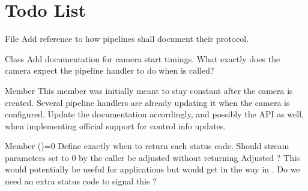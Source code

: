 \chapter{Todo List}
\hypertarget{todo}{}\label{todo}

\begin{DoxyRefList}
\item[File \doxylink{ipa__interface_8h}{ipa\+\_\+interface.h} ]\label{todo__todo000032}%
%
Add reference to how pipelines shall document their protocol. 
\item[Class \doxylink{classlibcamera_1_1Camera}{libcamera\+::Camera} ]\label{todo__todo000019}%
%
Add documentation for camera start timings. What exactly does the camera expect the pipeline handler to do when  is called? 
\item[Member \doxylink{classlibcamera_1_1Camera_1_1Private_ab4e183eb4dabe929d1b2bbbb519b969f}{libcamera\+::Camera\+::Private\+::control\+Info\+\_\+} ]\label{todo__todo000018}%
%
This member was initially meant to stay constant after the camera is created. Several pipeline handlers are already updating it when the camera is configured. Update the documentation accordingly, and possibly the API as well, when implementing official support for control info updates.  
\item[Member \doxylink{classlibcamera_1_1CameraConfiguration_a29f8f263384c6149775b6011c7397093}{libcamera\+::Camera\+Configuration\+::validate} ()=0]\label{todo__todo000016}%
%
Define exactly when to return each status code. Should stream parameters set to 0 by the caller be adjusted without returning Adjusted ? This would potentially be useful for applications but would get in the way in . Do we need an extra status code to signal this ?


\end{DoxyRefList}
